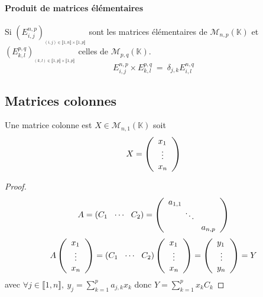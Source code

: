 		\paragraph{Produit de matrices élémentaires}
			Si $(E_{i,j}^{n,p})_{_{(i,j)\in\llbracket 1,n\rrbracket \times \llbracket 1,p 
			\rrbracket }}$ sont les matrices élémentaires de 
			$\mathcal{M}_{n,p} (\mathbb{K} )$
			et $(E_{k,l}^{p,q})_{_{(k,l)\in\llbracket 1,p\rrbracket \times \llbracket 1,p 
			\rrbracket }}$ celles de $\mathcal{M}_{p,q} (\mathbb{K} )$.
			\[E_{i,j}^{n,p} \times E_{k,l}^{p,q} ~=~ \delta_{j,k} E_{i,l}^{n,q}\] \trait
	\subsection{Matrices colonnes}
		Une matrice colonne est $X\in\mathcal{M}_{n,1} (\mathbb{K} )$ soit
		\[X= \left( \begin{array}{l}
		x_1 \\ \hspace*{4pt} \vdots \\ x_n
		\end{array} \right) \]
		\begin{proof}
		\[ A = (C_1 ~~\cdots ~~C_2) = \left( \begin{array}{l}
		a_{1,1} \hspace*{40pt} \\ \hspace*{20pt}\ddots \\ \hspace*{40pt} a_{n,p} 
		\end{array} \right)\]
		\[ A \left( \begin{array}{l} x_1 \\\hspace*{4pt} \vdots \\ x_n 
		\end{array} \right) = (C_1 ~~\cdots ~~C_2) \left( \begin{array}{l} x_1 \\
		\hspace*{4pt} \vdots \\ x_n \end{array} \right) = \left( 
		\begin{array}{l} y_1 \\\hspace*{4pt} \vdots \\ y_n \end{array}\right) = Y\]
		avec $\forall j\in \llbracket 1,n\rrbracket ,~ y_j = \sum\limits_{k=1}^p 
		a_{j,k} x_k $ donc $Y = \sum\limits_{k=1}^p x_k C_k$
		\end{proof}
